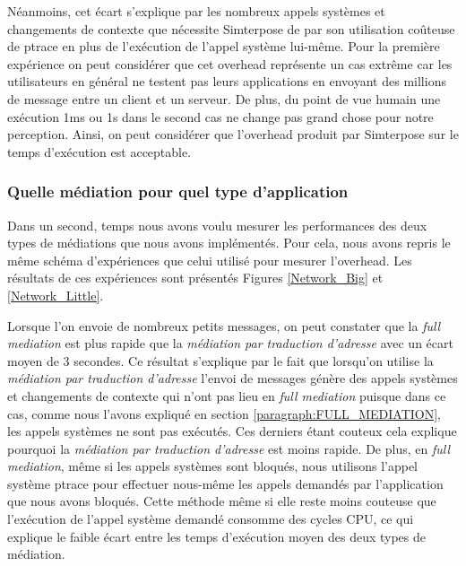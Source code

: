 Néanmoins, cet écart s'explique par les nombreux appels systèmes et changements de contexte que nécessite Simterpose de par son utilisation coûteuse de ptrace en plus de l'exécution de l'appel système lui-même. Pour la première expérience on peut considérer que cet overhead représente un cas extrême car les utilisateurs en général ne testent pas leurs applications en envoyant des millions de message entre un client et un serveur. De plus, du point de vue humain une exécution 1ms ou 1s dans le second cas ne change pas grand chose pour notre perception. Ainsi, on peut considérer que l'overhead produit par Simterpose sur le temps d'exécution est acceptable.

\subsubsection{Quelle médiation pour quel type d'application}
Dans un second, temps nous avons voulu mesurer les performances des deux types de médiations que nous avons implémentés. Pour cela, nous avons repris le même schéma d'expériences que celui utilisé pour mesurer l'overhead. Les résultats de ces expériences sont présentés Figures \ref{Network_Big} et \ref{Network_Little}.

Lorsque l'on envoie de nombreux petits messages, on peut constater que la \textit{full mediation} est plus rapide que la \textit{médiation par traduction d'adresse} avec un écart moyen de 3 secondes. Ce résultat s'explique par le fait que lorsqu'on utilise la \textit{médiation par traduction d'adresse} l'envoi de messages génère des appels systèmes et changements de contexte qui n'ont pas lieu en \textit{full mediation} puisque dans ce cas, comme nous l'avons expliqué en section \ref{paragraph:FULL_MEDIATION}, les appels systèmes ne sont pas exécutés. Ces derniers étant couteux cela explique pourquoi la  \textit{médiation par traduction d'adresse} est moins rapide. De plus, en \textit{full mediation}, même si les appels systèmes sont bloqués, nous utilisons l'appel système ptrace pour effectuer nous-même les appels demandés par l'application que nous avons bloqués. Cette méthode même si elle reste moins couteuse que l'exécution de l'appel système demandé consomme des cycles CPU, ce qui explique le faible écart entre les temps d'exécution moyen des deux types de médiation.

